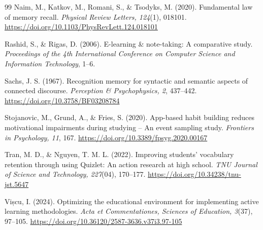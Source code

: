 \documentclass[oneside]{um}
\begin{document}
\begin{thebibliography}{99}
 Naim, M., Katkov, M., Romani, S., \& Tsodyks, M. (2020). Fundamental law of memory recall. \textit{Physical Review Letters, 124}(1), 018101. \url{https://doi.org/10.1103/PhysRevLett.124.018101}

 Rashid, S., \& Rigas, D. (2006). E-learning \& note-taking: A comparative study. \textit{Proceedings of the 4th International Conference on Computer Science and Information Technology}, 1–6.

 Sachs, J. S. (1967). Recognition memory for syntactic and semantic aspects of connected discourse. \textit{Perception \& Psychophysics, 2}, 437–442. \url{https://doi.org/10.3758/BF03208784}

 Stojanovic, M., Grund, A., \& Fries, S. (2020). App-based habit building reduces motivational impairments during studying – An event sampling study. \textit{Frontiers in Psychology, 11}, 167. \url{https://doi.org/10.3389/fpsyg.2020.00167}

 Tran, M. D., \& Nguyen, T. M. L. (2022). Improving students' vocabulary retention through using Quizlet: An action research at high school. \textit{TNU Journal of Science and Technology, 227}(04), 170–177. \url{https://doi.org/10.34238/tnu-jst.5647}

 Vișcu, I. (2024). Optimizing the educational environment for implementing active learning methodologies. \textit{Acta et Commentationes, Sciences of Education, 3}(37), 97–105. \url{https://doi.org/10.36120/2587-3636.v37i3.97-105}

\end{thebibliography}
\end{document}
